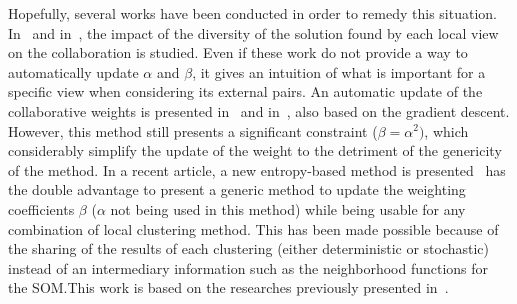     Hopefully, several works have been conducted in order to remedy this situation. In~\cite{grozavu2014diversity} and in~\cite{rastin2015collaborative}, the impact of the diversity of the solution found by each local view on the collaboration is studied. Even if these work do not provide a way to automatically update $\alpha$ and $\beta$, it gives an intuition of what is important for a specific view when considering its external pairs. An automatic update of the collaborative weights is presented in~\cite{grozavu2010topological} and in~\cite{grozavu2011learning}, also based on the gradient descent. However, this method still presents a significant constraint ($\beta = \alpha^2)$, which considerably simplify the update of the weight to the detriment of the genericity of the method. In a recent article, a new entropy-based method is presented~\cite{sublime2018optimizing} has the double advantage to present a generic method to update the weighting coefficients $\beta$ ($\alpha$ not being used in this method) while being usable for any combination of local clustering method. This has been made possible because of the sharing of the results of each clustering (either deterministic or stochastic) instead of an intermediary information such as the neighborhood functions for the SOM.\@ This work is based on the researches previously presented in~\cite{sublime2016contributions}.

